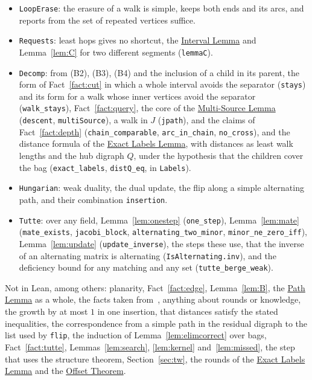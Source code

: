 \documentclass[11pt]{article}
\theoremstyle{definition}
\theoremstyle{remark}
\theoremstyle{plain}
\newcommand{\LemPath}{\hyperref[lem:path]{Path Lemma}}
\newcommand{\LemMS}{\hyperref[lem:ms]{Multi-Source Lemma}}
\newcommand{\LemLabels}{\hyperref[lem:labels]{Exact Labels Lemma}}
\newcommand{\ThmOff}{\hyperref[thm:off]{Offset Theorem}}
\begin{document}
\begin{itemize}
\item \texttt{LoopErase}: the erasure of a walk is simple, keeps both ends and its arcs, and reports from the set of repeated vertices suffice.
\item \texttt{Requests}: least hops gives no shortcut, the \hyperref[lem:A]{Interval Lemma} and Lemma~\ref{lem:C} for two different segments (\texttt{lemmaC}).
\item \texttt{Decomp}: from (B2), (B3), (B4) and the inclusion of a child in its parent, the form of Fact~\ref{fact:cut} in which a whole interval avoids the separator (\texttt{stays}) and its form for a walk whose inner vertices avoid the separator (\texttt{walk\_stays}), Fact~\ref{fact:query}, the core of the \LemMS{} (\texttt{descent}, \texttt{multiSource}), a walk in $J$ (\texttt{jpath}), and the claims of Fact~\ref{fact:depth} (\texttt{chain\_comparable}, \texttt{arc\_in\_chain}, \texttt{no\_cross}), and the distance formula of the \LemLabels{}, with distances as least walk lengths and the hub digraph $Q$, under the hypothesis that the children cover the bag (\texttt{exact\_labels}, \texttt{distQ\_eq}, in \texttt{Labels}).
\item \texttt{Hungarian}: weak duality, the dual update, the flip along a simple alternating path, and their combination \texttt{insertion}.
\item \texttt{Tutte}: over any field, Lemma~\ref{lem:onestep} (\texttt{one\_step}), Lemma~\ref{lem:mate} (\texttt{mate\_exists}, \texttt{jacobi\_block}, \texttt{alternating\_two\_minor}, \texttt{minor\_ne\_zero\_iff}), Lemma~\ref{lem:update} (\texttt{update\_inverse}), the steps these use, that the inverse of an alternating matrix is alternating (\texttt{IsAlternating.inv}), and the deficiency bound for any matching and any set (\texttt{tutte\_berge\_weak}).
\end{itemize}
Not in Lean, among others: planarity, Fact~\ref{fact:edge}, Lemma~\ref{lem:B}, the \LemPath{} as a whole, the facts taken from~\cite{LP19,P20,IKNS22}, anything about rounds or knowledge, the growth by at most $1$ in one insertion, that distances satisfy the stated inequalities, the correspondence from a simple path in the residual digraph to the list used by \texttt{flip}, the induction of Lemma~\ref{lem:elimcorrect} over bags, Fact~\ref{fact:tutte}, Lemmas~\ref{lem:search}, \ref{lem:kernel} and~\ref{lem:missed}, the step that uses the structure theorem, Section~\ref{sec:tw}, the rounds of the \LemLabels{} and the \ThmOff{}.
\end{document}
